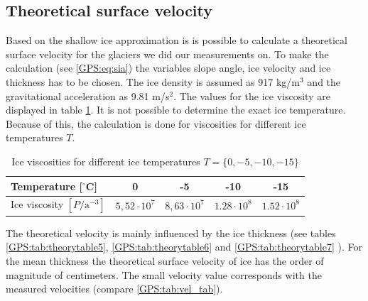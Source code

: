 \subsection{Theoretical surface velocity}
Based on the shallow ice approximation is is possible to calculate a theoretical surface velocity for the glaciers we did our measurements on.
To make the calculation (see \ref{GPS:eq:sia}) the variables slope angle, ice velocity and ice thickness has to be chosen. 
The ice density is assumed as 917 kg/m$^3$ and the gravitational acceleration as 9.81  m/s$^2$.
The values for the ice viscosity are displayed in table \ref{GPS:tab:iceviscosities}.
It is not possible to determine the exact ice temperature.
Because of this, the calculation is done for viscosities for different ice temperatures $T$.

\begin{table}[htb]
\centering
\begin{tabular}{lcccc}
\toprule
Temperature [$^\circ$C] & 0 & -5 & -10 & -15 \\
\midrule
Ice viscosity $\left[ P / \text{a}^{-3} \right]$ & $5,52 \cdot 10^7$ & $8,63 \cdot 10^7$ & $1.28 \cdot 10^8$ & $1.52 \cdot 10^8$\\
\bottomrule
\end{tabular}
\caption{Ice viscosities for different ice temperatures $T = \{0,-5,-10,-15\}$}
\label{GPS:tab:iceviscosities}
\end{table}

The theoretical velocity is mainly influenced by the ice thickness (see tables \ref{GPS:tab:theorytable5}, \ref{GPS:tab:theorytable6} and \ref{GPS:tab:theorytable7} ).
For the mean thickness the theoretical surface velocity of ice has the order of magnitude of centimeters. 
The small velocity value corresponds with the measured velocities (compare \ref{GPS:tab:vel_tab}). 

